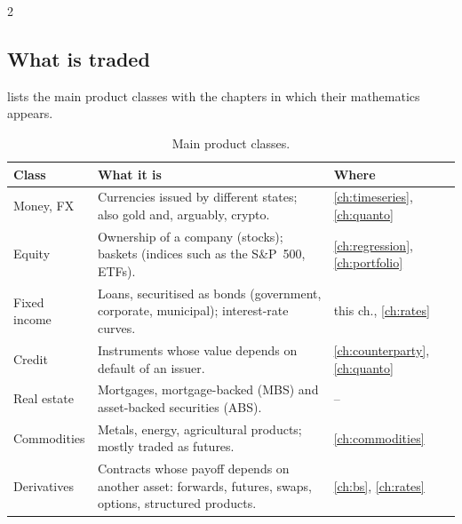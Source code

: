 \begin{paracol}{2}
\subsection{What is traded}
 lists the main product classes with the chapters in which their
mathematics appears.

\begin{table}[ht]
\centering\small
\caption{Main product classes.}\label{tab:products}
\begin{tabularx}{\linewidth}{@{}l X l@{}}
\toprule
\textbf{Class} & \textbf{What it is} & \textbf{Where}\\
\midrule
Money, FX & Currencies issued by different states; also gold and, arguably, crypto. & \ref{ch:timeseries}, \ref{ch:quanto}\\
Equity & Ownership of a company (stocks); baskets (indices such as the S\&P~500, ETFs). & \ref{ch:regression}, \ref{ch:portfolio}\\
Fixed income & Loans, securitised as bonds (government, corporate, municipal); interest-rate curves. & this ch., \ref{ch:rates}\\
Credit & Instruments whose value depends on default of an issuer. & \ref{ch:counterparty}, \ref{ch:quanto}\\
Real estate & Mortgages, mortgage-backed (MBS) and asset-backed securities (ABS). & --\\
Commodities & Metals, energy, agricultural products; mostly traded as futures. & \ref{ch:commodities}\\
Derivatives & Contracts whose payoff depends on another asset: forwards, futures, swaps, options, structured products. & \ref{ch:bs}, \ref{ch:rates}\\
\bottomrule
\end{tabularx}
\end{table}



\end{paracol}
